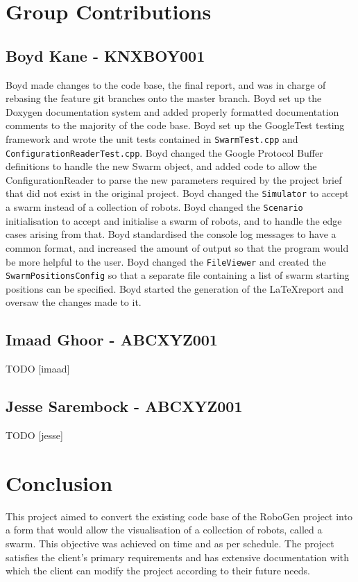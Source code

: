 \documentclass[11pt,a4paper]{article}
\begin{document}
\section{Group Contributions}
\label{s:group-contributions}

\subsection{Boyd Kane - KNXBOY001}
Boyd made changes to the code base, the final report, and was in charge of
rebasing the feature git branches onto the master branch. Boyd set up the
Doxygen documentation system and added properly formatted documentation comments
to the majority of the code base. Boyd set up the GoogleTest testing framework
and wrote the unit tests contained in \texttt{SwarmTest.cpp} and
\texttt{ConfigurationReaderTest.cpp}. Boyd changed the Google Protocol Buffer
definitions to handle the new Swarm object, and added code to allow the
ConfigurationReader to parse the new parameters required by the project brief
that did not exist in the original project. Boyd changed the
\texttt{Simulator} to accept a swarm instead of a collection of robots. Boyd
changed the \texttt{Scenario} initialisation to accept and initialise a swarm
of robots, and to handle the edge cases arising from that. Boyd standardised
the console log messages to have a common format, and increased the amount of
output so that the program would be more helpful to the user. Boyd changed the
\texttt{FileViewer} and created the \texttt{SwarmPositionsConfig} so that a
separate file containing a list of swarm starting positions can be specified.
Boyd started the generation of the \LaTeX report and oversaw the changes made
to it.

\subsection{Imaad Ghoor - ABCXYZ001}
TODO [imaad]


\subsection{Jesse Sarembock - ABCXYZ001}
TODO [jesse]

\section{Conclusion}
\label{s:conclusion}
This project aimed to convert the existing code base of the RoboGen project
into a form that would allow the visualisation of a collection of robots,
called a swarm. This objective was achieved on time and as per schedule. The
project satisfies the client's primary requirements and has extensive
documentation with which the client can modify the project according to their
future needs.
\end{document}
